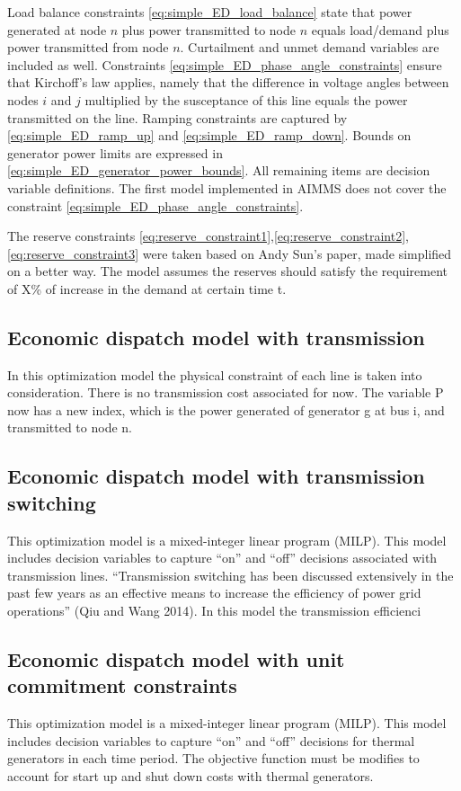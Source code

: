 \documentclass[10pt]{article}
\begin{document}
Load balance constraints \eqref{eq:simple_ED_load_balance} state that power generated at node $n$ plus power transmitted to node $n$ equals load/demand plus power transmitted from node $n$.  Curtailment and unmet demand variables are included as well. 
Constraints \eqref{eq:simple_ED_phase_angle_constraints} ensure that Kirchoff's law applies, namely that the difference in voltage angles between nodes $i$ and $j$ multiplied by the susceptance of this line equals the power transmitted on the line.
Ramping constraints are captured by \eqref{eq:simple_ED_ramp_up} and \eqref{eq:simple_ED_ramp_down}.
Bounds on generator power limits are expressed in \eqref{eq:simple_ED_generator_power_bounds}.
All remaining items are decision variable definitions. The first model implemented in AIMMS does not cover the constraint \eqref{eq:simple_ED_phase_angle_constraints}.

The reserve constraints \eqref{eq:reserve_constraint1},\eqref{eq:reserve_constraint2},\eqref{eq:reserve_constraint3} were taken based on Andy Sun's paper, made simplified on a better way. The model assumes the reserves should satisfy the requirement of X\% of increase in the demand at certain time t.

\subsection{Economic dispatch model with transmission}

In this optimization model the physical constraint of each line is taken into consideration. There is no transmission cost associated for now. The variable P now has a new index, which is the power generated of generator g at bus i, and transmitted to node n.

\subsection{Economic dispatch model with transmission switching}
This optimization model is a mixed-integer linear program (MILP).
This model includes decision variables to capture ``on'' and ``off'' decisions associated with transmission lines.
``Transmission switching has been discussed extensively in the past few years as an effective means to increase the efficiency of power grid operations'' (Qiu and Wang 2014). In this model the transmission efficienci


\subsection{Economic dispatch model with unit commitment constraints}
This optimization model is a mixed-integer linear program (MILP).
This model includes decision variables to capture ``on'' and ``off'' decisions for thermal generators in each time period. 
The objective function must be modifies to account for start up and shut down costs with thermal generators.
\end{document}
